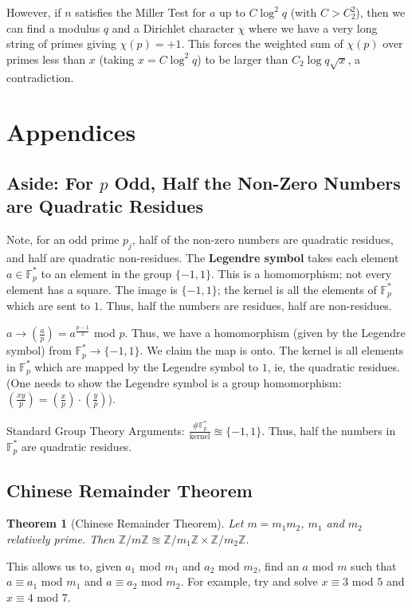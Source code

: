 \documentclass[12pt,letterpaper]{report}
\newcommand{\Z}{\ensuremath{\mathbb{Z}}}
\newcommand{\F}{\mathbb{F}}
\newcommand{\Fp}{ \F_p }
\newcommand{\Fpf}{ \Fp^{*} }
\newcommand\lag[2]{\ensuremath{\left(\frac{#1}{#2}\right)}}
\newtheorem{thm}{Theorem}[section]
\begin{document}
However, if $n$ satisfies the Miller Test for $a$ up to $C \log^2
q$ (with $C > C_2^2$), then we can find a modulus $q$ and a
Dirichlet character $\chi$ where we have a very long string of
primes giving $\chi(p) = +1$. This forces the weighted sum of
$\chi(p)$ over primes less than $x$ (taking $x = C \log^2 q$) to
be larger than $C_2 \log q \sqrt{x}$, a contradiction.

\section{Appendices}

\subsection{Aside: For $p$ Odd, Half the Non-Zero Numbers are
Quadratic Residues}

Note, for an odd prime $p_j$, half of the non-zero numbers are
quadratic residues, and half are quadratic non-residues. The
\textbf{Legendre symbol} takes each element $a \in \Fpf$ to an
element in the group $\{-1, 1\}$. This is a homomorphism; not
every element has a square. The image is $\{-1,1\}$; the kernel is
all the elements of $\Fpf$ which are sent to $1$. Thus, half the
numbers are residues, half are non-residues.

$a \rightarrow \lag{a}{p} = a^{\frac{p-1}{2}}$ mod $p$. Thus, we
have a homomorphism (given by the Legendre symbol) from $\Fpf
\rightarrow \{-1,1\}$. We claim the map is onto. The kernel is all
elements in $\Fpf$ which are mapped by the Legendre symbol to $1$,
ie, the quadratic residues. (One needs to show the Legendre symbol
is a group homomorphism: $\lag{xy}{p} = \lag{x}{p} \cdot
\lag{y}{p}$).

Standard Group Theory Arguments: $\frac{ \# \Fpf }{\mbox{kernel} }
\approxeq \{-1,1\}$. Thus, half the numbers in $\Fpf$ are
quadratic residues.

\subsection{Chinese Remainder Theorem}

\begin{thm}[Chinese Remainder Theorem]Let $m = m_1m_2$, $m_1$ and $m_2$
relatively prime. Then $\Z / m\Z \approxeq \Z/ m_1\Z \times \Z /
m_2 \Z$.
\end{thm}

This allows us to, given $a_1$ mod $m_1$ and $a_2$ mod $m_2$, find
an $a$ mod $m$ such that $a \equiv a_1$ mod $m_1$ and $a \equiv
a_2$ mod $m_2$. For example, try and solve $x \equiv 3$ mod $5$
and $x \equiv 4$ mod $7$.
\end{document}
